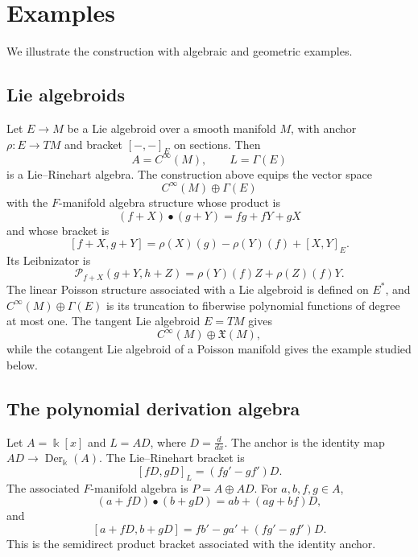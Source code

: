 \documentclass[12pt,reqno]{amsart}
\theoremstyle{definition}
\theoremstyle{remark}
\newcommand{\kk}{\Bbbk}
\newcommand{\Der}{\operatorname{Der}}
\newcommand{\Pcal}{\mathcal P}
\begin{document}
	
	
	
	\section{Examples}\label{sec:examples}
	
	We illustrate the construction with algebraic and geometric examples.
	
	
	\subsection{Lie algebroids}
	
	Let $E\to M$ be a Lie algebroid over a smooth manifold $M$, with anchor
	$\rho:E\to TM$ and bracket $[-,-]_E$ on sections.  Then
	\[
	A=C^\infty(M),
	\qquad
	L=\Gamma(E)
	\]
	is a Lie--Rinehart algebra.  The construction above equips the vector space
	\[
	C^\infty(M)\oplus\Gamma(E)
	\]
	with the $F$-manifold algebra structure whose product is
	\begin{equation}\label{eq:lie-algebroid-F-product}
		(f+X)\bullet(g+Y)=fg+fY+gX
	\end{equation}
	and whose bracket is
	\begin{equation}\label{eq:lie-algebroid-F-bracket}
		[f+X,g+Y]
		=\rho(X)(g)-\rho(Y)(f)+[X,Y]_E.
	\end{equation}
	Its Leibnizator is
	\begin{equation}\label{eq:lie-algebroid-Leibnizator}
		\Pcal_{f+X}(g+Y,h+Z)=\rho(Y)(f)Z+\rho(Z)(f)Y.
	\end{equation}
	The linear Poisson structure associated with a Lie algebroid is defined on
	\(E^*\), and \(C^\infty(M)\oplus\Gamma(E)\) is its truncation to fiberwise
	polynomial functions of degree at most one.  The tangent Lie algebroid
	\(E=TM\) gives
	\[
	C^\infty(M)\oplus\mathfrak X(M),
	\]
	while the cotangent Lie algebroid of a Poisson manifold gives the example
	studied below.
	
	
	
	
	\subsection{The polynomial derivation algebra}
	
	Let
	$
	A=\kk[x]$ and $
	L=A D$, where $
	D=\frac{d}{dx}.
	$
The anchor is the identity map $A D\to\Der_\kk(A)$.  The Lie--Rinehart bracket is
	\[
	[fD,gD]_L=(fg'-gf')D.
	\]
	The associated $F$-manifold algebra is
$
	P=A\oplus A D.
$
	For $a,b,f,g\in A$,
	\begin{equation}\label{eq:poly-product}
		(a+fD)\bullet(b+gD)=ab+(ag+bf)D,
	\end{equation}
	and
	\begin{equation}\label{eq:poly-bracket}
		[a+fD,b+gD]=fb'-ga'+(fg'-gf')D.
	\end{equation}
	This is the semidirect product bracket associated with the identity anchor.
	
\end{document}
